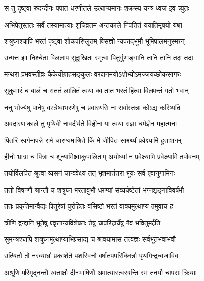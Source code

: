 \twolineshloka
{स तु दृष्ट्वा रुदन्दीनः पपात धरणीतले}
{उत्थाप्यमानः शक्रस्य यन्त्र ध्वज इव च्युतः} %

\twolineshloka
{अभिपेतुस्ततः सर्वे तस्यामात्याः शुचिव्रतम्}
{अन्तकाले निपतितं ययातिमृषयो यथा} %

\twolineshloka
{शत्रुघ्नश्चापि भरतं दृष्ट्वा शोकपरिप्लुतम्}
{विसंज्ञो न्यपतद्भूमौ भूमिपालमनुस्मरन्} %

\twolineshloka
{उन्मत्त इव निश्चेता विललाप सुदुःखितः}
{स्मृत्वा पितुर्गुणाङ्गानि तानि तानि तदा तदा} %

\twolineshloka
{मन्थरा प्रभवस्तीव्रः कैकेयीग्राहसङ्कुलः}
{वरदानमयोऽक्षोभ्योऽमज्जयच्छोकसागरः} %

\twolineshloka
{सुकुमारं च बालं च सततं लालितं त्वया}
{क्व तात भरतं हित्वा विलपन्तं गतो भवान्} %

\twolineshloka
{ननु भोज्येषु पानेषु वस्त्रेष्वाभरणेषु च}
{प्रवारयसि नः सर्वांस्तन्नः कोऽद्य करिष्यति} %

\twolineshloka
{अवदारण काले तु पृथिवी नावदीर्यते}
{विहीना या त्वया राज्ञा धर्मज्ञेन महात्मना} %

\twolineshloka
{पितरि स्वर्गमापन्ने रामे चारण्यमाश्रिते}
{किं मे जीवित सामर्थ्यं प्रवेक्ष्यामि हुताशनम्} %

\twolineshloka
{हीनो भ्रात्रा च पित्रा च शून्यामिक्ष्वाकुपालिताम्}
{अयोध्यां न प्रवेक्ष्यामि प्रवेक्ष्यामि तपोवनम्} %

\twolineshloka
{तयोर्विलपितं श्रुत्वा व्यसनं चान्ववेक्ष्य तत्}
{भृशमार्ततरा भूयः सर्व एवानुगामिनः} %

\twolineshloka
{ततो विषण्णौ श्रान्तौ च शत्रुघ्न भरतावुभौ}
{धरण्यां संव्यचेष्टेतां भग्नशृङ्गाविवर्षभौ} %

\twolineshloka
{ततः प्रकृतिमान्वैद्यः पितुरेषां पुरोहितः}
{वसिष्ठो भरतं वाक्यमुत्थाप्य तमुवाच ह} %

\twolineshloka
{त्रीणि द्वन्द्वानि भूतेषु प्रवृत्तान्यविशेषतः}
{तेषु चापरिहार्येषु नैवं भवितुमर्हति} %

\twolineshloka
{सुमन्त्रश्चापि शत्रुघ्नमुत्थाप्याभिप्रसाद्य च}
{श्रावयामास तत्त्वज्ञः सर्वभूतभवाभवौ} %

\twolineshloka
{उत्थितौ तौ नरव्याघ्रौ प्रकाशेते यशस्विनौ}
{वर्षातपपरिक्लिन्नौ पृथगिन्द्रध्वजाविव} %

\twolineshloka
{अश्रूणि परिमृद्नन्तौ रक्ताक्षौ दीनभाषिणौ}
{अमात्यास्त्वरयन्ति स्म तनयौ चापराः क्रियाः} %


